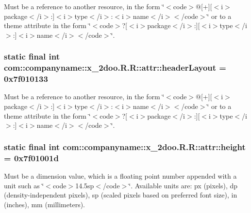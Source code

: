 Must be a reference to another resource, in the form \char`\"{}$<$code$>$@\mbox{[}+\mbox{]}\mbox{[}$<$i$>$package$<$/i$>$:\mbox{]}$<$i$>$type$<$/i$>$:$<$i$>$name$<$/i$>$$<$/code$>$\char`\"{} or to a theme attribute in the form \char`\"{}$<$code$>$?\mbox{[}$<$i$>$package$<$/i$>$:\mbox{]}\mbox{[}$<$i$>$type$<$/i$>$:\mbox{]}$<$i$>$name$<$/i$>$$<$/code$>$\char`\"{}. \hypertarget{classcom_1_1companyname_1_1x__2doo_1_1_r_1_1attr_8089b41de18447ef8cbebe46d1fc644b}{
\subsubsection[{headerLayout}]{\setlength{\rightskip}{0pt plus 5cm}static final int com::companyname::x\_\-2doo.R.R::attr::headerLayout = 0x7f010133}}
\label{classcom_1_1companyname_1_1x__2doo_1_1_r_1_1attr_8089b41de18447ef8cbebe46d1fc644b}


Must be a reference to another resource, in the form \char`\"{}$<$code$>$@\mbox{[}+\mbox{]}\mbox{[}$<$i$>$package$<$/i$>$:\mbox{]}$<$i$>$type$<$/i$>$:$<$i$>$name$<$/i$>$$<$/code$>$\char`\"{} or to a theme attribute in the form \char`\"{}$<$code$>$?\mbox{[}$<$i$>$package$<$/i$>$:\mbox{]}\mbox{[}$<$i$>$type$<$/i$>$:\mbox{]}$<$i$>$name$<$/i$>$$<$/code$>$\char`\"{}. \hypertarget{classcom_1_1companyname_1_1x__2doo_1_1_r_1_1attr_c32c88251553c82c893800333495ef41}{
\subsubsection[{height}]{\setlength{\rightskip}{0pt plus 5cm}static final int com::companyname::x\_\-2doo.R.R::attr::height = 0x7f01001d}}
\label{classcom_1_1companyname_1_1x__2doo_1_1_r_1_1attr_c32c88251553c82c893800333495ef41}


Must be a dimension value, which is a floating point number appended with a unit such as \char`\"{}$<$code$>$14.5sp$<$/code$>$\char`\"{}. Available units are: px (pixels), dp (density-independent pixels), sp (scaled pixels based on preferred font size), in (inches), mm (millimeters). 

